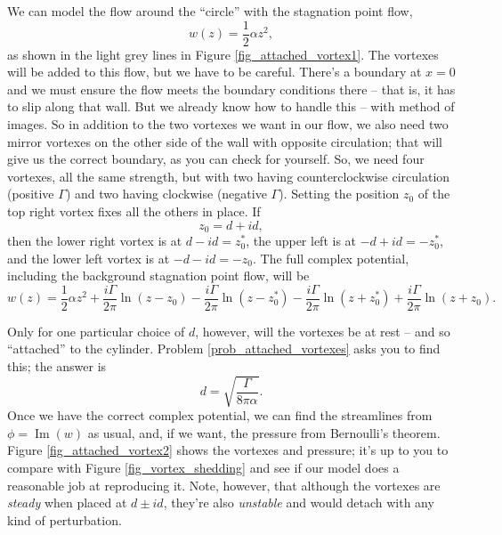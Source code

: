 We can model the flow around the ``circle'' with the stagnation point flow, 
\[
w(z) = \frac{1}{2} \alpha z^2,
\]
as shown in the light grey lines in Figure \ref{fig_attached_vortex1}.  The vortexes will be added to this flow, but we have to be careful.  There's a boundary at $x=0$ and we must ensure the flow meets the boundary conditions there -- that is, it has to slip along that wall.  But we already know how to handle this -- with method of images.  So in addition to the two vortexes we want in our flow, we also need two mirror vortexes on the other side of the wall with opposite circulation; that will give us the correct boundary, as you can check for yourself.  So, we need four vortexes, all the same strength, but with two having counterclockwise circulation (positive $\Gamma$) and two having clockwise (negative $\Gamma$).  Setting the position $z_0$ of the top right vortex fixes all the others in place.  If
\[
z_0 = d + id,
\]
then the lower right vortex is at $d - id = z_0^*$, the upper left is at $-d + id = -z_0^*$, and the lower left vortex is at $-d -id = -z_0$.  The full complex potential, including the background stagnation point flow, will be
\begin{equation}
\label{eq_w_vortex_shedding}
w(z) = \frac{1}{2} \alpha z^2 + \frac{i\Gamma}{2\pi} \ln (z - z_0) -  \frac{i\Gamma}{2\pi} \ln (z - z_0^*) -  \frac{i\Gamma}{2\pi} \ln (z + z_0^*) +  \frac{i\Gamma}{2\pi} \ln (z + z_0).
\end{equation}

Only for one particular choice of $d$, however, will the vortexes be at rest -- and so ``attached'' to the cylinder.  Problem \ref{prob_attached_vortexes} asks you to find this; the answer is
\begin{equation}
d = \sqrt{\frac{\Gamma}{8 \pi \alpha}}.
\end{equation}
Once we have the correct complex potential, we can find the streamlines from $\phi = \operatorname{Im}(w)$ as usual, and, if we want, the pressure from Bernoulli's theorem.  Figure \ref{fig_attached_vortex2} shows the vortexes and pressure; it's up to you to compare with Figure \ref{fig_vortex_shedding} and see if our model does a reasonable job at reproducing it.  Note, however, that although the vortexes are \emph{steady} when placed at $d \pm id$, they're also \emph{unstable} and would detach with any kind of perturbation.

